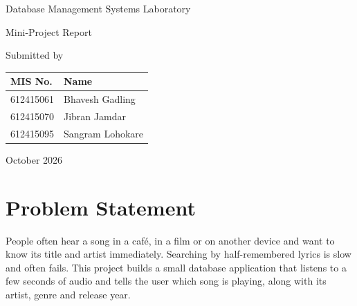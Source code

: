 \documentclass[11pt,a4paper]{article}
\begin{document}
\begin{titlepage}
\thispagestyle{empty}
\centering

\vspace*{2.5cm}

{\huge Database Management Systems Laboratory\par}
\vspace{0.6cm}
{\LARGE Mini-Project Report\par}

\vspace{1.8cm}

\noindent\fbox{%
    \parbox{\dimexpr\linewidth-2\fboxsep-2\fboxrule\relax}{%
        \centering
        \vspace{0.5cm}
        {\Huge\bfseries VibeCheck\par}
        \vspace{0.3cm}
        {\Large Audio Recognition and Discovery System\par}
        \vspace{0.5cm}
    }%
}\par

\vspace{2.2cm}

{\large Submitted by\par}
\vspace{0.4cm}

\begin{tabular}{|l|l|}
\hline
\textbf{MIS No.} & \textbf{Name} \\
\hline
612415061 & Bhavesh Gadling \\
\hline
612415070 & Jibran Jamdar \\
\hline
612415095 & Sangram Lohokare \\
\hline
\end{tabular}

\vfill

{\large October 2026\par}

\end{titlepage}
\tableofcontents
\newpage

\section{Problem Statement}

People often hear a song in a caf\'e, in a film or on another device and want to know its title and artist immediately. Searching by half-remembered lyrics is slow and often fails. This project builds a small database application that listens to a few seconds of audio and tells the user which song is playing, along with its artist, genre and release year.
\end{document}
